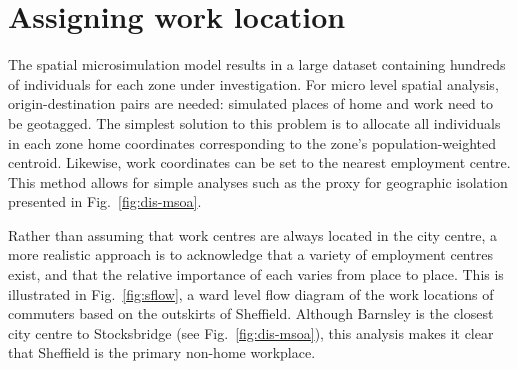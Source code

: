 \documentclass[a4paper, 11pt, twoside]{Thesis}
\begin{document}
\section{Assigning work location}
\label{s:workdes}
The spatial microsimulation model results in a large dataset containing
hundreds of individuals for each zone under investigation. For micro level
spatial analysis, origin-destination pairs are needed: simulated
places of home and work need to be geotagged. The simplest solution
to this problem is to allocate all individuals in each zone home coordinates
corresponding to the zone's population-weighted centroid. Likewise, work coordinates
can be set to the nearest employment centre. This method allows
for simple analyses such as the proxy for geographic
isolation presented in Fig.~\ref{fig:dis-msoa}.

Rather than assuming that work centres are always located in the city
centre, a more realistic approach is to acknowledge that a variety of
employment centres exist, and that the relative importance of each varies from
place to place. This is illustrated in Fig.~\ref{fig:sflow}, a ward level
flow diagram of
the work locations of commuters based on the outskirts of Sheffield. Although
Barnsley is the closest city centre to Stocksbridge (see
Fig.~\ref{fig:dis-msoa}), this analysis makes it clear that Sheffield is the
primary non-home workplace.
\end{document}
